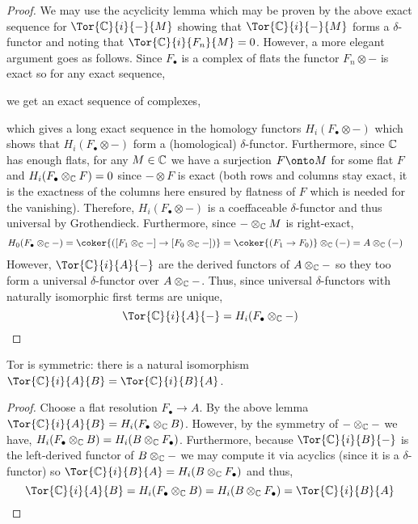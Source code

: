 \documentclass[12pt]{article}
\begin{document}
\begin{proof}
We may use the acyclicity lemma which may be proven by the above exact sequence for $\Tor{\C}{i}{-}{M}$ showing that $\Tor{\C}{i}{-}{M}$ forms a $\delta$-functor and noting that $\Tor{\C}{i}{F_n}{M} = 0$. However, a more elegant argument goes as follows. Since $F_\bullet$ is a complex of flats the functor $F_n \otimes -$ is exact so for any exact sequence,
\begin{center}
\end{center}
we get an exact sequence of complexes,
\begin{center}
\end{center}
which gives a long exact sequence in the homology functors $H_i(F_\bullet \otimes -)$ which shows that $H_i(F_\bullet \otimes -)$ form a (homological) $\delta$-functor. Furthermore, since $\mathbb{C}$ has enough flats, for any $M \in \mathbb{C}$ we have a surjection $F \onto M$ for some flat $F$ and $H_i(F_\bullet \otimes_{\mathbb{C}} F) = 0$ since $- \otimes F$ is exact (both rows and columns stay exact, it is the exactness of the columns here ensured by flatness of $F$ which is needed for the vanishing). Therefore,  $H_i(F_\bullet \otimes -)$ is a coeffaceable $\delta$-functor and thus universal by Grothendieck. Furthermore, since $- \otimes_{\mathbb{C}} M$ is right-exact,
\begin{align*}
H_0(F_\bullet \otimes_\C -) & = \coker{([F_1 \otimes_\C -] \to [F_0 \otimes_\C -])} = \coker{(F_1 \to F_0)} \otimes_\C (-) = A \otimes_\C (-)
\end{align*}
However, $\Tor{\C}{i}{A}{-}$ are the derived functors of $A \otimes_{\mathbb{C}} -$ so they too form a universal $\delta$-functor over $A \otimes_{\mathbb{C}} -$. Thus, since universal $\delta$-functors with naturally isomorphic first terms are unique,
\[ \Tor{\C}{i}{A}{-} = H_i(F_\bullet \otimes_\C -) \]
\end{proof}

\begin{prop}
Tor is symmetric: there is a natural isomorphism $\Tor{\C}{i}{A}{B} = \Tor{\C}{i}{B}{A}$.
\end{prop}

\begin{proof}
Choose a flat resolution $F_\bullet \to A$. By the above lemma $\Tor{\C}{i}{A}{B} = H_i(F_\bullet \otimes_\C B)$. However, by the symmetry of $- \otimes_{\mathbb{C}} -$ we have, $H_i(F_\bullet \otimes_{\mathbb{C}} B) = H_i(B \otimes_{\mathbb{C}} F_\bullet)$. Furthermore, because $\Tor{\C}{i}{B}{-}$ is the left-derived functor of $B \otimes_{\mathbb{C}} -$ we may compute it via acyclics (since it is a $\delta$-functor) so $\Tor{\C}{i}{B}{A} = H_i(B \otimes_\C F_\bullet)$ and thus,
\[ \Tor{\C}{i}{A}{B} = H_i(F_\bullet \otimes_\C B) = H_i(B \otimes_\C F_\bullet) = \Tor{\C}{i}{B}{A} \]
\end{proof}
\end{document}
